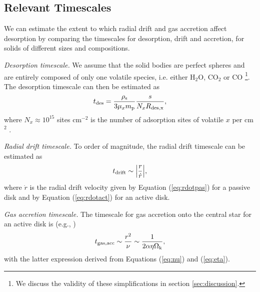 \documentclass[apj]{emulateapj}
\newcommand{\emgr}[1]{\emph{ \color{gray} #1}}
\begin{document}

\subsection{Relevant Timescales}
\label{sec:timescales}

We can estimate the extent to which radial drift and gas accretion affect desorption by comparing the timescales for desorption, drift and accretion, for solids of different sizes and compositions. 

\textit{Desorption timescale.} We assume that the solid bodies are perfect spheres and are entirely composed of only one volatile species, i.e. either H$_2$O, CO$_2$ or CO \footnote{We discuss the validity of these simplifications in section \ref{sec:discussion}.}. The desorption timescale can then be estimated as
\begin{equation}
\label{eq:tdes}
t_{\rm des}=\frac{\rho_{\rm s}}{3 \mu_x m_{\rm p}} \frac{s}{N_x R_{\rm des, x}},
\end{equation}
where $N_x \approx 10^{15}$ sites cm$^{-2}$ is the number of adsorption sites of volatile $x$ per cm$^2$ \citep{hollenbach09}. 

\textit{Radial drift timescale.} To order of magnitude, the radial drift timescale can be estimated as 
\begin{equation}
\label{eq:tdrift}
t_{\rm drift} \sim \Big|\frac{r}{\dot{r}}\Big|,
\end{equation}
where $\dot{r}$ is the radial drift velocity given by Equation (\ref{eq:rdotpas}) for a passive disk and by Equation (\ref{eq:rdotact}) for an active disk.

\textit{Gas accretion timescale.} The timescale for gas accretion onto the central star for an active disk is (e.g., \citealt{armitage10})
\begin{equation}
\label{eq:tgas}
t_{\rm gas, acc} \sim \frac{r^2}{\nu} \sim \frac{1}{2 \alpha \eta \Omega_{\rm k}},
\end{equation}
with the latter expression derived from Equations (\ref{eq:nu}) and (\ref{eq:eta}).
\end{document}

